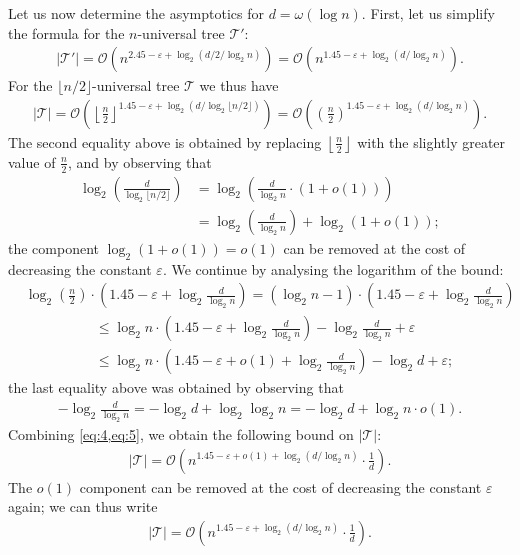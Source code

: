 \documentclass[envcountsect,envcountsame]{llncs}
\newcommand{\Oo}{\mathcal{O}}
\newcommand{\Tt}{\mathcal{T}}
\newcommand{\floor}[1]{\lfloor#1\rfloor}
\begin{document}
	Let us now determine the asymptotics for $d=\omega(\log n)$.
	First, let us simplify the formula for the $n$-universal tree $\Tt'$:
	\begin{align*}
		|\Tt'|=\Oo(n^{2{.}45-\varepsilon+\log_2(d/2/\log_2 n)})
			=\Oo(n^{1{.}45-\varepsilon+\log_2(d/\log_2 n)}).
	\end{align*}
	For the $\floor{n/2}$-universal tree $\Tt$ we thus have
	\begin{align}\label{eq:4}
		|\Tt|=\Oo\left(\left\lfloor\frac{n}{2}\right\rfloor^{1{.}45-\varepsilon+\log_2(d/\log_2 \floor{n/2})}\right)
			=\Oo\left(\left(\frac{n}{2}\right)^{1{.}45-\varepsilon+\log_2(d/\log_2 n)}\right).
	\end{align}
	The second equality above is obtained by replacing $\left\lfloor\frac{n}{2}\right\rfloor$ with the slightly greater value of $\frac{n}{2}$, and by observing that
	\begin{align*}
		\log_2\left(\frac{d}{\log_2\floor{n/2}}\right)&=\log_2\left(\frac{d}{\log_2n}\cdot(1+o(1))\right)\\
		&=\log_2\left(\frac{d}{\log_2n}\right)+\log_2(1+o(1));
	\end{align*}
	the component $\log_2(1+o(1))=o(1)$ can be removed at the cost of decreasing the constant $\varepsilon$.
	We continue by analysing the logarithm of the bound:
	\begin{align}
		&\log_2\left(\frac{n}{2}\right)\cdot\left(1{.}45-\varepsilon+\log_2\frac{d}{\log_2 n}\right)
		=\left(\log_2n-1\right)\cdot\left(1{.}45-\varepsilon+\log_2\frac{d}{\log_2 n}\right)\nonumber\\
		&\hspace{5em}\leq\log_2n\cdot\left(1{.}45-\varepsilon+\log_2\frac{d}{\log_2 n}\right)-\log_2\frac{d}{\log_2 n}+\varepsilon\nonumber\\
		&\hspace{5em}\leq\log_2n\cdot\left(1{.}45-\varepsilon+o(1)+\log_2\frac{d}{\log_2 n}\right)-\log_2d+\varepsilon;\label{eq:5}
	\end{align}
	the last equality above was obtained by observing that
	\begin{align*}
		-\log_2\frac{d}{\log_2 n}=-\log_2d+\log_2\log_2n=-\log_2d+\log_2n\cdot o(1).
	\end{align*}
	Combining \cref{eq:4,eq:5}, we obtain the following bound on $|\Tt|$:
	\begin{align*}
		|\Tt|=\Oo\left(n^{1{.}45-\varepsilon+o(1)+\log_2(d/\log_2 n)}\cdot\frac{1}{d}\right).
	\end{align*}
	The $o(1)$ component can be removed at the cost of decreasing the constant $\varepsilon$ again;
	we can thus write
	\begin{align*}
		|\Tt|=\Oo\left(n^{1{.}45-\varepsilon+\log_2(d/\log_2 n)}\cdot\frac{1}{d}\right).
	\end{align*}
\end{document}
